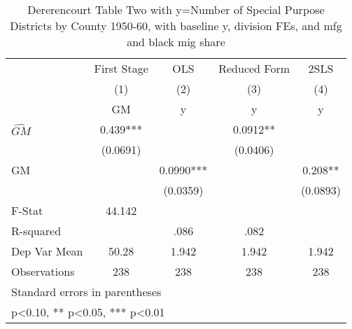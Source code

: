 \begin{table}[htbp]\centering
\def\sym#1{\ifmmode^{#1}\else\(^{#1}\)\fi}
\caption{Dererencourt Table Two with y=Number of Special Purpose Districts by County 1950-60, with baseline y, division FEs, and mfg and black mig share}
\begin{tabular}{l*{4}{c}}
\toprule
                    & First Stage   &         OLS   &Reduced Form   &        2SLS   \\
                    &\multicolumn{1}{c}{(1)}&\multicolumn{1}{c}{(2)}&\multicolumn{1}{c}{(3)}&\multicolumn{1}{c}{(4)}\\
                    &\multicolumn{1}{c}{GM}&\multicolumn{1}{c}{y}&\multicolumn{1}{c}{y}&\multicolumn{1}{c}{y}\\
\midrule
$\hat{GM}$          &       0.439***&               &      0.0912** &               \\
                    &    (0.0691)   &               &    (0.0406)   &               \\
\addlinespace
GM                  &               &      0.0990***&               &       0.208** \\
                    &               &    (0.0359)   &               &    (0.0893)   \\
\midrule
F-Stat              &      44.142   &               &               &               \\
R-squared           &               &        .086   &        .082   &               \\
Dep Var Mean        &       50.28   &       1.942   &       1.942   &       1.942   \\
Observations        &         238   &         238   &         238   &         238   \\
\bottomrule
\multicolumn{5}{l}{\footnotesize Standard errors in parentheses}\\
\multicolumn{5}{l}{\footnotesize * p<0.10, ** p<0.05, *** p<0.01}\\
\end{tabular}
\end{table}
